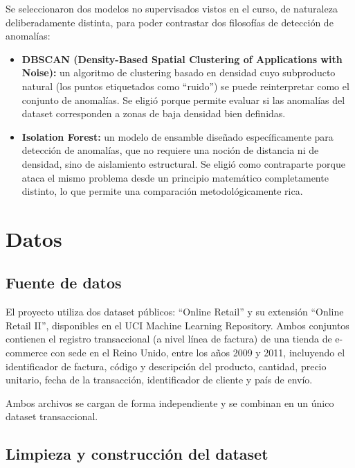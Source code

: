 \documentclass[11pt]{article}
\begin{document}
Se seleccionaron dos modelos no supervisados vistos en el curso, de naturaleza deliberadamente distinta,
para poder contrastar dos filosofías de detección de anomalías:

\begin{itemize}
    \item \textbf{DBSCAN (Density-Based Spatial Clustering of Applications with Noise):} un algoritmo de
    clustering basado en densidad cuyo subproducto natural (los puntos etiquetados como ``ruido'')
    se puede reinterpretar como el conjunto de anomalías. Se eligió porque permite evaluar si las
    anomalías del dataset corresponden a zonas de baja densidad bien definidas.
    \item \textbf{Isolation Forest:} un modelo de ensamble diseñado específicamente para detección de anomalías,
    que no requiere una noción de distancia ni de densidad, sino de aislamiento estructural. Se eligió
    como contraparte porque ataca el mismo problema desde un principio matemático completamente
    distinto, lo que permite una comparación metodológicamente rica.
\end{itemize}

\section*{Datos}

\subsection*{Fuente de datos}

El proyecto utiliza dos dataset públicos: ``Online Retail'' y su extensión ``Online Retail II'', disponibles en el
UCI Machine Learning Repository. Ambos conjuntos contienen el registro transaccional (a nivel línea de
factura) de una tienda de e-commerce con sede en el Reino Unido, entre los años 2009 y 2011, incluyendo
el identificador de factura, código y descripción del producto, cantidad, precio unitario, fecha de la
transacción, identificador de cliente y país de envío.

Ambos archivos se cargan de forma independiente y se combinan en un único dataset transaccional.

\subsection*{Limpieza y construcción del dataset}
\end{document}
